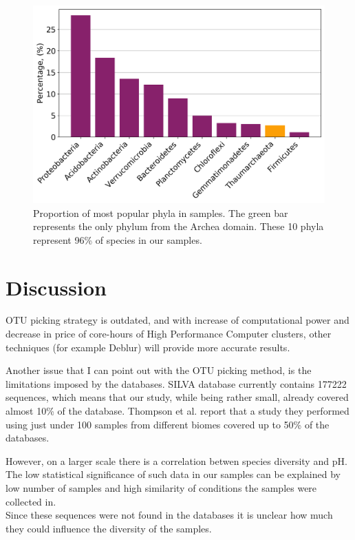 \documentclass[12pt,twocolumn]{article}
\begin{document}
\begin{figure}[ht!]
	\includegraphics[width=\linewidth]{top_10.png}
	\caption{Proportion of most popular phyla in samples. The green bar represents the only phylum from the Archea domain. These 10 phyla represent 96\% of species in our samples.}
	\label{fig:top_taxa}
\end{figure}
%
%
\newpage
\section{Discussion}
OTU picking strategy is outdated, and with increase of computational power and decrease in price of core-hours of High Performance Computer clusters, other techniques (for example Deblur\cite{Amir}) will provide more accurate results.
\par

Another issue that I can point out with the OTU picking method, is the limitations imposed by the databases. SILVA database currently contains 177222 sequences, which means that our study, while being rather small, already covered almost 10\% of the database. Thompson et al.\cite{Thompson2017} report that a study they performed using just under 100 samples from different biomes covered up to 50\% of the databases.
\par

However, on a larger scale there is a correlation betwen species diversity and pH\cite{Thompson2017,Fierer2006,Wu2016}. The low statistical significance of such data in our samples can be explained by low number of samples and high similarity of conditions the samples were collected in.
\\
Since these sequences were not found in the databases it is unclear how much they could influence the diversity of the samples.



\newpage


\end{document}
